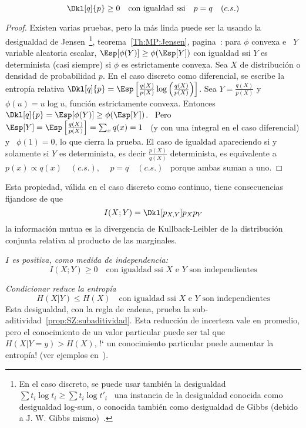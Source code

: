 \begin{lema}
  \[
  \Dkl[q]{p} \ge 0 \quad \mbox{con igualdad ssi} \quad p = q \quad (c.s.)
  \]
\end{lema}
%
\begin{proof}
  Existen varias pruebas, pero la m\'as linda puede ser la usando la desigualdad
  de  Jensen~\footnote{En   el  caso  discreto,  se  puede   usar  tambi\'en  la
    desigualdad \ $\sum t_i \log t_i \ge  \sum t_i \log t'_i$ \ una instancia de
    la desigualdad conocida como  desigualdad log-sum, o conocida tambi\'en como
    desigualdad de  Gibbs (debido a J.  W.   Gibbs mismo)~\cite{Gib02, CovTho06,
      Rio07,         Mer10,         Mer18}.},        teorema~\ref{Th:MP:Jensen},
  pagina~\pageref{Th:MP:Jensen}: para $\phi$ convexa  e \ $Y$ variable aleatoria
  escalar,   $\Esp[\phi(Y)]  \ge   \phi(\Esp[Y])$  con   igualdad  ssi   $Y$  es
  determinista (casi  siempre) si $\phi$  es estrictamente convexa.  Sea  $X$ de
  distribuci\'on  o densidad  de probabilidad  $p$.   En el  caso discreto  como
  diferencial,  se  escribe  la  entrop\'ia relativa  $\Dkl[q]{p}  =  \Esp\left[
    \frac{q(X)}{p(X)} \log \left( \frac{q(X)}{p(X)}  \right) \right]$.  Sea $Y =
  \frac{q(X)}{p(X)}$ y  $\phi(u) = u  \log u$, funci\'on  estrictamente convexa.
  Entonces $\Dkl[q]{p} = \Esp[\phi(Y)] \ge  \phi(\Esp[Y])$.  \ Pero \ $\Esp[Y] =
  \Esp\left[ \frac{q(X)}{p(X)} \right] = \sum_x q(x)  = 1$ \ (y con una integral
  en el caso diferencial) y \ $\phi(1) = 0$, lo que cierra la prueba. El caso de
  igualdad  apareciendo  si  y  solamente  si  $Y$  es  determinista,  es  decir
  $\frac{p(X)}{q(X)}$ determinista, es equivalente  a \ $p(x) \propto q(x) \quad
  (c.s.)$, \ \ie \ $p = q \quad (c.s.)$ \ porque ambas suman a uno.
\end{proof}

Esta propiedad, v\'alida en el  caso discreto como continuo, tiene consecuencias
fijandose de que
%
\[
I(X;Y) = \Dkl[p_{X,Y}]{p_X p_Y}
\]
%
\ie  la  informaci\'on  mutua  es  la  divergencia  de  Kullback-Leibler  de  la
distribuci\'on conjunta relativa al producto de las marginales.
%
\begin{propiedades}
\item\label{prop:SZ:Ipositive}   {\it   $I$   es   positiva,  como   medida   de
    independencia:}
  \[
  I(X;Y) \ge 0 \quad \mbox{con igualdad ssi $X$ e $Y$ son independientes}
  \]
%
\item\label{prop:SZ:condicionar} {\it  Condicionar reduce la  entrop\'ia}
  \[
  H(X|Y) \le H(X) \quad \mbox{con igualdad ssi $X$ e $Y$ son independientes}
  \]
  Esta    desigualdad,     con    la     regla    de    cadena,     prueba    la
  sub-aditividad~\ref{prop:SZ:subaditividad}.   Esta  reducci\'on  de  incerteza
  vale en  promedio, pero el conocimiento  de un valor particular  puede ser tal
  que $H(X|Y =  y) > H(X)$, \ie !` un conocimiento  particular puede aumentar la
  entrop\'ia!  (ver ejemplos en~\cite[p.~59]{Rio07}).
\end{propiedades}


